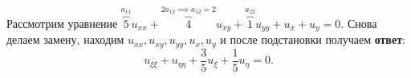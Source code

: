 \begin{example}
    Рассмотрим уравнение $\overbrace{5}^{a_{11}} u_{xx} + \overbrace{4}^{2 a_{12} \implies a_{12} = 2} u_{xy} + \overbrace{1}^{a_{22}} u_{yy} + u_x + u_y = 0$. Снова делаем замену, находим $u_{xx}, u_{xy}, u_{yy}, u_x, u_y$ и после подстановки получаем \textbf{ответ}:
    $$ u_{\xi \xi} + u_{\eta \eta} + \dfrac{3}{5} u_\xi + \dfrac{1}{5} u_\eta = 0. $$
\end{example}\pagebreak